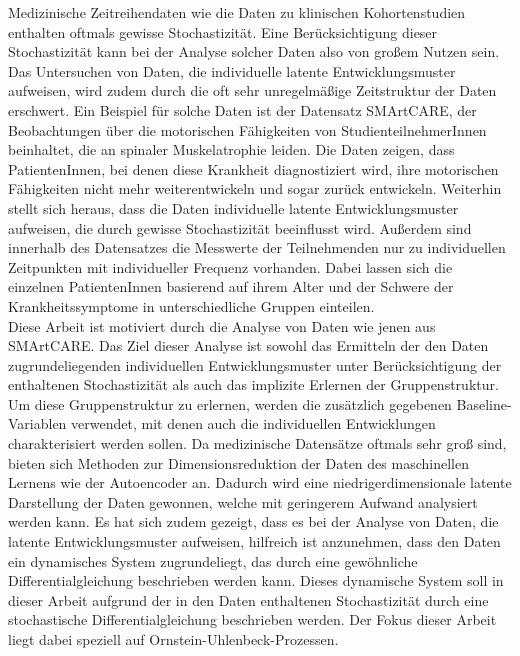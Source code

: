 \documentclass[11pt,titlepage]{article}
\theoremstyle{definition}
\theoremstyle{remark}
\begin{document}
	Medizinische Zeitreihendaten wie die Daten zu klinischen Kohortenstudien enthalten oftmals gewisse Stochastizität. Eine Berücksichtigung dieser Stochastizität kann bei der Analyse solcher Daten also von großem Nutzen sein. Das Untersuchen von Daten, die individuelle latente Entwicklungsmuster aufweisen, wird zudem durch die oft sehr unregelmäßige Zeitstruktur der Daten erschwert. Ein Beispiel für solche Daten ist der Datensatz SMArtCARE, der Beobachtungen über die motorischen Fähigkeiten von StudienteilnehmerInnen beinhaltet, die an spinaler Muskelatrophie leiden. Die Daten zeigen, dass PatientenInnen, bei denen diese Krankheit diagnostiziert wird, ihre motorischen Fähigkeiten nicht mehr weiterentwickeln und sogar zurück entwickeln. Weiterhin stellt sich heraus, dass die Daten  individuelle latente Entwicklungsmuster aufweisen, die durch gewisse Stochastizität beeinflusst wird. Außerdem sind innerhalb des Datensatzes die Messwerte der Teilnehmenden nur zu individuellen Zeitpunkten mit individueller Frequenz vorhanden. Dabei lassen sich die einzelnen PatientenInnen basierend auf ihrem Alter und der Schwere der Krankheitssymptome in unterschiedliche Gruppen einteilen.\\
	Diese Arbeit ist motiviert durch die Analyse von Daten wie jenen aus SMArtCARE. Das Ziel dieser Analyse ist sowohl das Ermitteln der den Daten zugrundeliegenden individuellen Entwicklungsmuster unter Berücksichtigung der enthaltenen Stochastizität als auch das implizite Erlernen der Gruppenstruktur. Um diese Gruppenstruktur zu erlernen, werden die zusätzlich gegebenen Baseline-Variablen verwendet, mit denen auch die individuellen Entwicklungen charakterisiert werden sollen. Da medizinische Datensätze oftmals sehr groß sind, bieten sich Methoden zur Dimensionsreduktion der Daten des maschinellen Lernens wie der Autoencoder an. Dadurch wird eine niedrigerdimensionale latente Darstellung der Daten gewonnen, welche mit geringerem Aufwand analysiert werden kann. Es hat sich zudem gezeigt, dass es bei der Analyse von Daten, die latente Entwicklungsmuster aufweisen, hilfreich ist anzunehmen, dass den Daten ein dynamisches System zugrundeliegt, das durch eine gewöhnliche Differentialgleichung beschrieben werden kann. Dieses dynamische System soll in dieser Arbeit aufgrund der in den Daten enthaltenen Stochastizität durch eine stochastische Differentialgleichung beschrieben werden. Der Fokus dieser Arbeit liegt dabei speziell auf Ornstein-Uhlenbeck-Prozessen.\\
\end{document}
